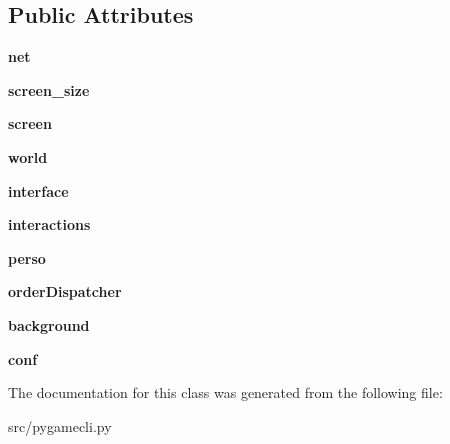 \subsection*{\-Public \-Attributes}
\begin{DoxyCompactItemize}
\item 
\hypertarget{classsrc_1_1pygamecli_1_1_client_a0e742b5de5f03151b09caf3c95ee1992}{{\bfseries net}}\label{classsrc_1_1pygamecli_1_1_client_a0e742b5de5f03151b09caf3c95ee1992}

\item 
\hypertarget{classsrc_1_1pygamecli_1_1_client_a772adbfc301c5ff132a638cf6b299e94}{{\bfseries screen\-\_\-size}}\label{classsrc_1_1pygamecli_1_1_client_a772adbfc301c5ff132a638cf6b299e94}

\item 
\hypertarget{classsrc_1_1pygamecli_1_1_client_aed1d2758edb675dee480721367da838e}{{\bfseries screen}}\label{classsrc_1_1pygamecli_1_1_client_aed1d2758edb675dee480721367da838e}

\item 
\hypertarget{classsrc_1_1pygamecli_1_1_client_aa35e45c3b9bed483eb3a72cf974889b8}{{\bfseries world}}\label{classsrc_1_1pygamecli_1_1_client_aa35e45c3b9bed483eb3a72cf974889b8}

\item 
\hypertarget{classsrc_1_1pygamecli_1_1_client_ade0cca319a3da0ca7dcfe6ea8fb48415}{{\bfseries interface}}\label{classsrc_1_1pygamecli_1_1_client_ade0cca319a3da0ca7dcfe6ea8fb48415}

\item 
\hypertarget{classsrc_1_1pygamecli_1_1_client_ac53685090a7b5457619fdd1f9018b4d7}{{\bfseries interactions}}\label{classsrc_1_1pygamecli_1_1_client_ac53685090a7b5457619fdd1f9018b4d7}

\item 
\hypertarget{classsrc_1_1pygamecli_1_1_client_a2f37356f4028744c41f57e9d7a9a79a2}{{\bfseries perso}}\label{classsrc_1_1pygamecli_1_1_client_a2f37356f4028744c41f57e9d7a9a79a2}

\item 
\hypertarget{classsrc_1_1pygamecli_1_1_client_a8c68c36dbfceeb7866839df4421f4b27}{{\bfseries order\-Dispatcher}}\label{classsrc_1_1pygamecli_1_1_client_a8c68c36dbfceeb7866839df4421f4b27}

\item 
\hypertarget{classsrc_1_1pygamecli_1_1_client_a60206e650a62f4ebf6a81cf333b2a130}{{\bfseries background}}\label{classsrc_1_1pygamecli_1_1_client_a60206e650a62f4ebf6a81cf333b2a130}

\item 
\hypertarget{classsrc_1_1pygamecli_1_1_client_a210e805a54e4975af2f3608244768619}{{\bfseries conf}}\label{classsrc_1_1pygamecli_1_1_client_a210e805a54e4975af2f3608244768619}

\end{DoxyCompactItemize}


\-The documentation for this class was generated from the following file\-:\begin{DoxyCompactItemize}
\item 
src/pygamecli.\-py\end{DoxyCompactItemize}
